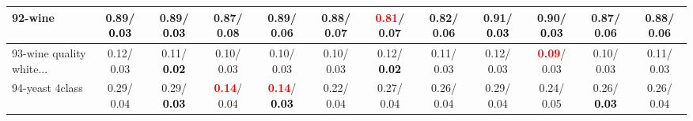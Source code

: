 \begin{table}[h]
\begin{center}
{\begin{tabular}{lc|c|c|c|c|c|c|c|c|c|c}
92-wine &   0.89/\textcolor{black}{\textbf{  0.03}} &   0.89/\textcolor{black}{\textbf{  0.03}} &   0.87/  0.08 &   0.89/  0.06 &   0.88/  0.07 & \textcolor{red}{\textbf{  0.81}}/  0.07 &   0.82/  0.06 &   0.91/\textcolor{black}{\textbf{  0.03}} &   0.90/\textcolor{black}{\textbf{  0.03}} &   0.87/  0.06 &   0.88/  0.06 \\ \hline
93-wine quality white... &   0.12/  0.03 &   0.11/\textcolor{black}{\textbf{  0.02}} &   0.10/  0.03 &   0.10/  0.03 &   0.10/  0.03 &   0.12/\textcolor{black}{\textbf{  0.02}} &   0.11/  0.03 &   0.12/  0.03 & \textcolor{red}{\textbf{  0.09}}/  0.03 &   0.10/  0.03 &   0.11/  0.03 \\
94-yeast 4class &   0.29/  0.04 &   0.29/\textcolor{black}{\textbf{  0.03}} & \textcolor{red}{\textbf{  0.14}}/  0.04 & \textcolor{red}{\textbf{  0.14}}/\textcolor{black}{\textbf{  0.03}} &   0.22/  0.04 &   0.27/  0.04 &   0.26/  0.04 &   0.29/  0.04 &   0.24/  0.05 &   0.26/\textcolor{black}{\textbf{  0.03}} &   0.26/  0.04 \\\end{tabular}}\label{stratsALCKappa2besta}
\end{center}
\end{table}

